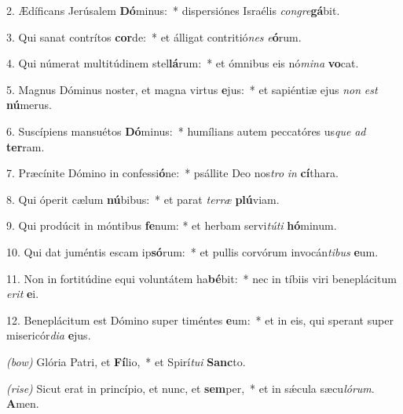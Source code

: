 2. Ædíficans Jerúsalem \textbf{Dó}minus:~*
	dispersiónes Israélis \textit{con}\textit{gre}\textbf{gá}bit.

3. Qui sanat contrítos \textbf{cor}de:~*
	et álligat contritió\textit{nes} \textit{e}\textbf{ó}rum.

4. Qui númerat multitúdinem stel\textbf{lá}rum:~*
	et ómnibus eis nó\textit{mi}\textit{na} \textbf{vo}cat.

5. Magnus Dóminus noster, et magna virtus \textbf{e}jus:~*
	et sapiéntiæ ejus \textit{non} \textit{est} \textbf{nú}merus.

6. Suscípiens mansuétos \textbf{Dó}minus:~*
	humílians autem peccatóres us\textit{que} \textit{ad} \textbf{ter}ram.

7. Præcínite Dómino in confessi\textbf{ó}ne:~*
	psállite Deo nos\textit{tro} \textit{in} \textbf{cí}thara.

8. Qui óperit cælum \textbf{nú}bibus:~*
	et parat \textit{ter}\textit{ræ} \textbf{plú}viam.

9. Qui prodúcit in móntibus \textbf{fe}num: *
	et herbam servi\textit{tú}\textit{ti} \textbf{hó}minum.

10. Qui dat juméntis escam ip\textbf{só}\-rum:~*
	et pullis corvórum invocán\textit{ti}\textit{bus} \textbf{e}um.

11. Non in fortitúdine equi voluntátem ha\textbf{bé}bit:~*
	nec in tíbiis viri beneplácitum \textit{e}\textit{rit} \textbf{e}i.

12. Beneplácitum est Dómino super timéntes \textbf{e}um:~*
	et in eis, qui sperant super misericór\textit{di}\textit{a} \textbf{e}jus.

\textit{(bow)} Glória Patri, et \textbf{Fí}lio,~*
	et Spirí\textit{tu}\textit{i} \textbf{Sanc}to.

\textit{(rise)} Sicut erat in princípio, et nunc, et \textbf{sem}per,~*
	et in s\'{\ae}cula sæcu\textit{ló}\textit{rum}. \textbf{A}men.